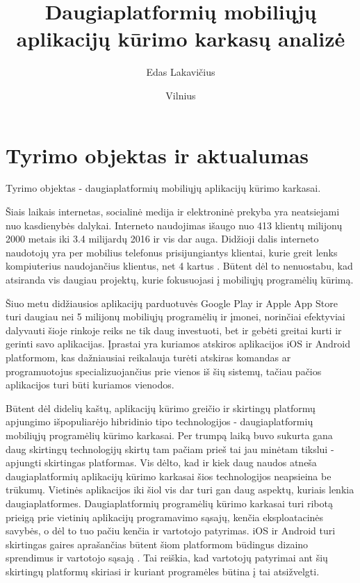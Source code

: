 \documentclass{VUMIFInfBakalaurinis}
\title{Daugiaplatformių mobiliųjų aplikacijų kūrimo karkasų analizė}
\author{Edas Lakavičius}
\date{Vilnius \\ \the\year}
\begin{document}
\maketitle

\tableofcontents

\section{Tyrimo objektas ir aktualumas}
Tyrimo objektas - daugiaplatformių mobiliųjų aplikacijų kūrimo karkasai.

Šiais laikais internetas, socialinė medija ir elektroninė prekyba yra neatsiejami nuo kasdienybės dalykai. Interneto naudojimas išaugo nuo 413 klientų milijonų 2000 metais iki 3.4 milijardų 2016 \cite{owidinternet} ir vis dar auga. Didžioji dalis interneto naudotojų yra per mobilius telefonus prisijungiantys klientai, kurie greit lenks kompiuterius naudojančius klientus, net 4 kartus \cite{internetusage}. Būtent dėl to nenuostabu, kad atsiranda vis daugiau projektų, kurie fokusuojasi į mobiliųjų programėlių kūrimą.

Šiuo metu didžiausios aplikacijų parduotuvės Google Play ir Apple App Store turi daugiau nei 5 milijonų mobiliųjų programėlių \cite{appcount} ir įmonei, norinčiai efektyviai dalyvauti šioje rinkoje reiks ne tik daug investuoti, bet ir gebėti greitai kurti ir gerinti savo aplikacijas. Įprastai yra kuriamos atskiros aplikacijos iOS ir Android platformom, kas dažniausiai reikalauja turėti atskiras komandas ar programuotojus specializuojančius prie vienos iš šių sistemų, tačiau pačios aplikacijos turi būti kuriamos vienodos.

Būtent dėl didelių kaštų, aplikacijų kūrimo greičio ir skirtingų platformų apjungimo išpopuliarėjo hibridinio tipo technologijos - daugiaplatformių mobiliųjų programėlių kūrimo karkasai. Per trumpą laiką buvo sukurta gana daug skirtingų technologijų skirtų tam pačiam prieš tai jau minėtam tikslui - apjungti skirtingas platformas. Vis dėlto, kad ir kiek daug naudos atneša daugiaplatformių aplikacijų kūrimo karkasai šios technologijos neapsieina be trūkumų. Vietinės aplikacijos iki šiol vis dar turi gan daug aspektų, kuriais lenkia daugiaplatformes. Daugiaplatformių programėlių kūrimo karkasai turi ribotą prieigą prie vietinių aplikacijų programavimo sąsajų, kenčia eksploatacinės savybės, o dėl to tuo pačiu kenčia ir vartotojo patyrimas. iOS ir Android turi skirtingas gaires aprašančias būtent šiom platformom būdingus dizaino sprendimus ir vartotojo sąsają \cite{androidui, iosui}. Tai reiškia, kad vartotojų patyrimai ant šių skirtingų platformų skiriasi ir kuriant programėles būtina į tai atsižvelgti.
\end{document}
